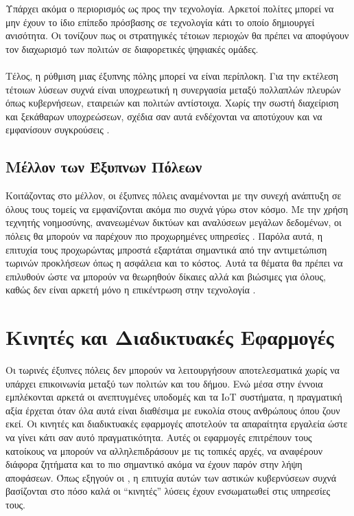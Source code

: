 Υπάρχει ακόμα ο περιορισμός ως προς την τεχνολογία. Αρκετοί πολίτες μπορεί να μην έχουν το ίδιο επίπεδο πρόσβασης σε τεχνολογία κάτι το οποίο δημιουργεί ανισότητα. Οι \textcite{drakouli2019} τονίζουν πως οι στρατηγικές τέτοιων περιοχών θα πρέπει να αποφύγουν τον διαχωρισμό των πολιτών σε διαφορετικές ψηφιακές ομάδες.
\\
\\
Τέλος, η ρύθμιση μιας έξυπνης πόλης μπορεί να είναι περίπλοκη. Για την εκτέλεση τέτοιων λύσεων συχνά είναι υποχρεωτική η συνεργασία μεταξύ πολλαπλών πλευρών όπως κυβερνήσεων, εταιρειών και πολιτών αντίστοιχα. Χωρίς την σωστή διαχείριση και ξεκάθαρων υποχρεώσεων, σχέδια σαν αυτά ενδέχονται να αποτύχουν και να εμφανίσουν συγκρούσεις \parencite{anthopoulos2015defining}.

\subsection{Μέλλον των Έξυπνων Πόλεων}
Κοιτάζοντας στο μέλλον, οι έξυπνες πόλεις αναμένονται με την συνεχή ανάπτυξη σε όλους τους τομείς να εμφανίζονται ακόμα πιο συχνά γύρω στον κόσμο. Με την χρήση τεχνητής νοημοσύνης, ανανεωμένων δικτύων και αναλύσεων μεγάλων δεδομένων, οι πόλεις θα μπορούν να παρέχουν πιο προχωρημένες υπηρεσίες \parencite{macadar2016smart}. Παρόλα αυτά, η επιτυχία τους προχωρώντας μπροστά εξαρτάται σημαντικά από την αντιμετώπιση τωρινών προκλήσεων όπως η ασφάλεια και το κόστος. Αυτά τα θέματα θα πρέπει να επιλυθούν ώστε να μπορούν να θεωρηθούν δίκαιες αλλά και βιώσιμες για όλους, καθώς δεν είναι αρκετή μόνο η επικέντρωση στην τεχνολογία \parencite{arroub2016literature}.
\\
\section{Κινητές και Διαδικτυακές Εφαρμογές}
Οι τωρινές έξυπνες πόλεις δεν μπορούν να λειτουργήσουν αποτελεσματικά χωρίς να υπάρχει επικοινωνία μεταξύ των πολιτών και του δήμου. Ενώ μέσα στην έννοια εμπλέκονται αρκετά οι ανεπτυγμένες υποδομές και τα IoT συστήματα, η πραγματική αξία έρχεται όταν όλα αυτά είναι διαθέσιμα με ευκολία στους ανθρώπους όπου ζουν εκεί. Οι κινητές και διαδικτυακές εφαρμογές αποτελούν τα απαραίτητα εργαλεία ώστε να γίνει κάτι σαν αυτό πραγματικότητα. Αυτές οι εφαρμογές επιτρέπουν τους κατοίκους να μπορούν να αλληλεπιδράσουν με τις τοπικές αρχές, να αναφέρουν διάφορα ζητήματα και το πιο σημαντικό ακόμα να έχουν παρόν στην λήψη αποφάσεων. Όπως εξηγούν οι \textcite{hou2020road} , η επιτυχία αυτών των αστικών κυβερνύσεων συχνά βασίζονται στο πόσο καλά οι “κινητές” λύσεις έχουν ενσωματωθεί στις υπηρεσίες τους. 


